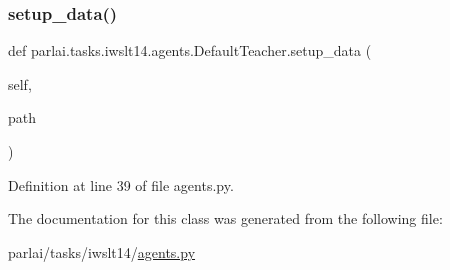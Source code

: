 \subsubsection{\texorpdfstring{setup\+\_\+data()}{setup\_data()}}
{\footnotesize\ttfamily def parlai.\+tasks.\+iwslt14.\+agents.\+Default\+Teacher.\+setup\+\_\+data (\begin{DoxyParamCaption}\item[{}]{self,  }\item[{}]{path }\end{DoxyParamCaption})}



Definition at line 39 of file agents.\+py.



The documentation for this class was generated from the following file\+:\begin{DoxyCompactItemize}
\item 
parlai/tasks/iwslt14/\hyperlink{parlai_2tasks_2iwslt14_2agents_8py}{agents.\+py}\end{DoxyCompactItemize}
